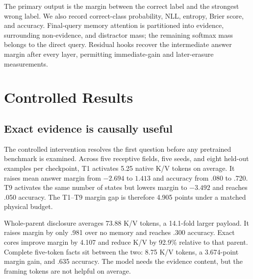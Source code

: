 \documentclass[11pt]{article}
\begin{document}
The primary output is the margin between the correct label and the strongest wrong label.  We also
record correct-class probability, NLL, entropy, Brier score, and accuracy.  Final-query memory
attention is partitioned into evidence, surrounding non-evidence, and distractor mass; the
remaining softmax mass belongs to the direct query.  Residual hooks recover the intermediate
answer margin after every layer, permitting immediate-gain and later-erasure measurements.

\section{Controlled Results}

\subsection{Exact evidence is causally useful}

The controlled intervention resolves the first question before any pretrained benchmark is
examined.  Across five receptive fields, five seeds, and eight held-out examples per checkpoint,
T1 activates 5.25 native K/V tokens on average.  It raises mean answer margin from $-2.694$ to
$1.413$ and accuracy from .080 to .720.  T9 activates the same number of states but lowers margin
to $-3.492$ and reaches .050 accuracy.  The T1--T9 margin gap is therefore 4.905 points under a
matched physical budget.

Whole-parent disclosure averages 73.88 K/V tokens, a 14.1-fold larger payload.  It raises margin
by only .981 over no memory and reaches .300 accuracy.  Exact cores improve margin by 4.107 and
reduce K/V by 92.9\% relative to that parent.  Complete five-token facts sit between the two:
8.75 K/V tokens, a 3.674-point margin gain, and .635 accuracy.  The model needs the evidence
content, but the framing tokens are not helpful on average.
\end{document}
